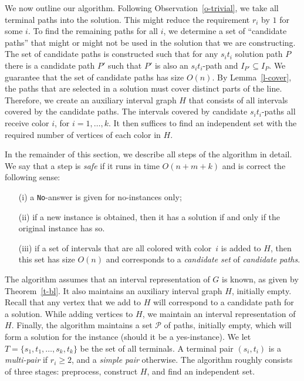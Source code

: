 \documentclass{llncs}
\newcommand{\mc}{\mathcal}
\begin{document}
We now outline our algorithm. Following Observation~\ref{o-trivial}, we take all terminal paths into the solution. This might reduce the requirement $r_{i}$ by $1$ for some $i$. To find the remaining  paths for all $i$, we determine a set of ``candidate paths'' that might or might not be used in the solution that we are constructing. The set of candidate paths is constructed such that for any $s_it_i$ solution path $P$ there is a candidate path $P'$ such that $P'$ is also an $s_it_i$-path and $I_{P'} \subseteq I_{P}$. We guarantee that the set of candidate paths has size $O(n)$. By Lemma~\ref{l-cover}, the paths that are selected in a solution must cover distinct parts of the line. Therefore, we create an auxiliary interval graph $H$ that consists of all intervals covered by the candidate paths. The intervals covered by candidate $s_it_i$-paths all receive color $i$, for $i=1,\ldots,k$. It then suffices to find an independent set with the required number of vertices of each color in $H$. 

In the remainder of this section, we describe all steps of the algorithm in detail. 
We say that a step is {\em safe} if it runs in time $O(n+m+k)$ and is correct the following sense: 
\begin{itemize}
\item [(i)] a \texttt{No}-answer is given for no-instances only;
\item [(ii)] if a new instance is obtained, then it has a solution if and only if the original instance has so.
\item [(iii)] if a set of intervals that are all colored with color~$i$ is added to $H$, then this set has size $O(n)$ and corresponds to a \emph{candidate set} of {\em candidate paths}.
\end{itemize}
The algorithm assumes that an interval representation of $G$ is known, as given by Theorem~\ref{t-bl}. It also maintains an auxiliary interval graph $H$, initially empty. Recall that any vertex that we add to $H$ will correspond to a candidate path for a solution. While adding vertices to $H$, we maintain an interval representation of $H$. Finally, the algorithm maintains a set $\mc{P}$ of paths, initially empty, which will form a solution for the instance (should it be a yes-instance). We let $T = \{s_{1},t_{1},\ldots,s_{k},t_{k}\}$ be the set of all terminals. A terminal pair $(s_i,t_i)$ is a {\em multi-pair} if $r_i\geq 2$, and a {\em simple pair} otherwise. 
The algorithm roughly consists of three stages: preprocess, construct $H$, and find an independent set.
\end{document}
